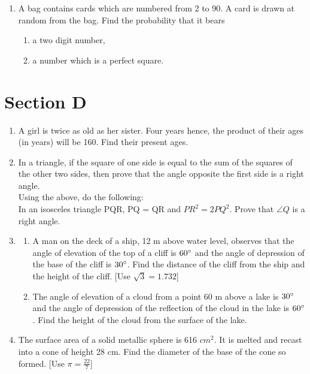 \documentclass[journal,12pt,twocolumn]{IEEEtran}
\renewcommand\thesection{\arabic{section}}
\begin{document}
\begin{enumerate}[label=\thesection.\arabic*.,ref=\thesection.\theenumi]
\begin{enumerate}
\begin{figure}[h!]
	\caption{}
	\label{fig5}
 \end{figure}
\end{enumerate}
\item A bag contains cards which are numbered from 2 to 90. A card is drawn at random from the bag. Find the probability that it bears \\
\begin{enumerate}
\item a two digit number,
\item a number which is a perfect square. 
\end{enumerate}
\end{enumerate}
\section{Section D}
\renewcommand{\theequation}{\theenumi}
\begin{enumerate}[label=\thesection.\arabic*.,ref=\thesection.\theenumi]
\item A girl is twice as old as her sister. Four years hence, the product of their ages (in years) will be 160. Find their present ages. \\
\item In a triangle, if the square of one side is equal to the sum of the squares of the other two sides, then prove that the angle opposite the first side is a right angle. \\
Using the above, do the following: \\ In an isosceles triangle PQR, PQ = QR and $PR^2=2PQ^2$. Prove that $\angle Q$ is a right angle. \\
\item \begin{enumerate}
\item A man on the deck of a ship, 12 m above water level, observes that the angle of elevation of the top of a cliff is $60\degree$ and the angle of depression of the base of the cliff is $30\degree$. Find the distance of the cliff from the ship and the height of the cliff. [Use $\sqrt{3}= 1.732$] \\
\item The angle of elevation of a cloud from a point 60 m above a lake is $30\degree$ and the angle of depression of the reflection of the cloud in the lake is $60\degree$. Find the height of the cloud from the surface of the lake. \\
\end{enumerate}
\item The surface area of a solid metallic sphere is 616 $cm^2$. It is melted and recast into a cone of height 28 cm. Find the diameter of the base of the cone so formed.  [Use $\pi=\frac{22}{7}$] \\
\end{enumerate}
\end{document}
